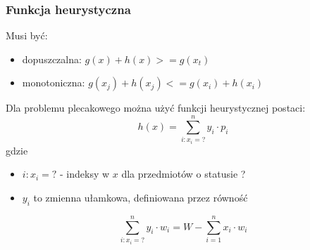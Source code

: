 \documentclass[11pt]{article}
\begin{document}
\subsubsection{Funkcja heurystyczna}
\label{sec:org76d913e}
Musi być:
\begin{itemize}
\item dopuszczalna: \(g(x) + h(x) >= g(x_t)\)
\item monotoniczna: \(g(x_j) + h(x_j) <= g(x_i) + h(x_i)\)
\end{itemize}
Dla problemu plecakowego można użyć funkcji heurystycznej postaci:
$$
        h(x) = \sum_{i:x_i=?}^n{y_i \cdot p_i}
$$
gdzie
\begin{itemize}
\item \(i:x_i=?\) - indeksy w \(x\) dla przedmiotów o statusie ?
\item \(y_i\) to zmienna ułamkowa, definiowana przez równość
\end{itemize}
$$
        \sum_{i:x_i=?}^n{y_i \cdot w_i} = W - \sum_{i=1}^n{x_i \cdot w_i}
$$
\end{document}
